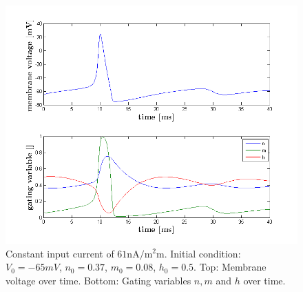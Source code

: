 \documentclass{scrartcl}
\begin{document}
\begin{figure}
\centering
\includegraphics[trim = {1.4cm 0.3 1.8cm 1cm}, height=0.35\textheight, clip]{../pics/med_minus}
\caption{Constant input current of $61 \si{\nano\ampere\per\square\milli\meter}$. Initial condition: $V_0 = -65\si{mV}$, $n_0 = 0.37$, $m_0 = 0.08$, $h_0 = 0.5$. Top: Membrane voltage over time. Bottom: Gating variables $n, m$ and $h$ over time.}
\label{med_minus}
\end{figure}
\end{document}
